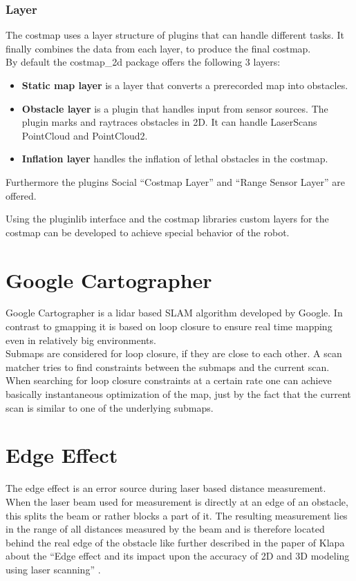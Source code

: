\subsubsection{Layer}
The costmap uses a layer structure of plugins that can handle different tasks. It finally combines the data from each layer, to produce the final costmap.\\

By default the costmap\_2d package offers the following 3 layers:
\begin{itemize}
	\item \textbf{Static map layer} is a layer that converts a prerecorded map into obstacles.
	\item  \textbf{Obstacle layer} is a plugin that handles input from sensor sources. The plugin marks and raytraces obstacles in 2D. It can handle LaserScans PointCloud and PointCloud2.
	\item \textbf{Inflation layer} handles the inflation of lethal obstacles in the costmap.
\end{itemize}

Furthermore the plugins Social ``Costmap Layer'' and ``Range Sensor Layer'' are offered.

Using the pluginlib interface and the costmap libraries custom layers for the costmap can be developed to achieve special behavior of the robot.



\section{Google Cartographer}
Google Cartographer is a lidar based SLAM algorithm developed by Google. In contrast to gmapping it is based on loop closure to ensure real time mapping even in relatively big environments.\\
Submaps are considered for loop closure, if they are close to each other. A scan matcher tries to find constraints between the submaps and the current scan. When searching for loop closure constraints at a certain rate one can achieve basically instantaneous optimization of the map, just by the fact that the current scan is similar to one of the underlying submaps\cite{cartographer}.\\

\section{Edge Effect}

The edge effect is an error source during laser based distance measurement.
When the laser beam used for measurement is directly at an edge of an obstacle, this splits the beam or rather blocks a part of it. The resulting measurement lies in the range of all distances measured by the beam and is therefore located behind the real edge of the obstacle like further described in the paper of Klapa about the ``Edge effect and its impact upon the accuracy of 2D and 3D modeling using laser scanning'' \cite{edgeeffect}.\\


